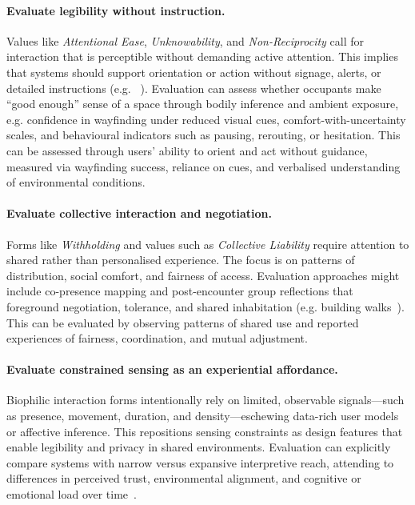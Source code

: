 \paragraph{Evaluate legibility without instruction.}
Values like \emph{Attentional Ease}, \emph{Unknowability}, and \emph{Non-Reciprocity} call for interaction that is perceptible without demanding active attention. This implies that systems should support orientation or action without signage, alerts, or detailed instructions (e.g. ~\cite{swaminathan2021tactile}). Evaluation can assess whether occupants make ``good enough'' sense of a space through bodily inference and ambient exposure, e.g. confidence in wayfinding under reduced visual cues, comfort-with-uncertainty scales, and behavioural indicators such as pausing, rerouting, or hesitation. This can be assessed through users’ ability to orient and act without guidance, measured via wayfinding success, reliance on cues, and verbalised understanding of environmental conditions.

\paragraph{Evaluate collective interaction and negotiation.}
Forms like \emph{Withholding} and values such as \emph{Collective Liability} require attention to shared rather than personalised experience. The focus is on patterns of distribution, social comfort, and fairness of access. Evaluation approaches might include co-presence mapping and post-encounter group reflections that foreground negotiation, tolerance, and shared inhabitation (e.g. building walks~\cite{mitchell2020no, mitchell2020human}). This can be evaluated by observing patterns of shared use and reported experiences of fairness, coordination, and mutual adjustment.

\paragraph{Evaluate constrained sensing as an experiential affordance.}
Biophilic interaction forms intentionally rely on limited, observable signals—such as presence, movement, duration, and density—eschewing data-rich user models or affective inference. This repositions sensing constraints as design features that enable legibility and privacy in shared environments. Evaluation can explicitly compare systems with narrow versus expansive interpretive reach, attending to differences in perceived trust, environmental alignment, and cognitive or emotional load over time~\cite{dalton2020habitech, moran2013using, paraschivoiu2023postcards}. 

